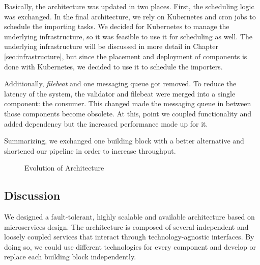 Basically, the architecture was updated in two places. First, the scheduling
logic was exchanged. In the final architecture, we rely on Kubernetes and
cron jobs to schedule the importing tasks. We decided for Kubernetes to
manage the underlying infrastructure, so it was feasible to use it for scheduling
as well. The underlying infrastructure will be discussed in more detail
in Chapter \ref{sec:infrastructure}, but since the placement and deployment
of components is done with Kubernetes, we decided to use it to schedule
the importers.

Additionally, \emph{filebeat} and one messaging queue got removed. To reduce
the latency of the system, the validator and filebeat were merged into a single
component: the consumer. This changed made the messaging queue in between
those components become obsolete. At this, point we coupled functionality
and added dependency but the increased performance made up for it.

Summarizing, we exchanged one building block with a better alternative
and shortened our pipeline in order to increase throughput.

\begin{figure}
	\caption{Evolution of Architecture}
	\label{fig:evol_architecture}
\end{figure}

\subsection{Discussion}\label{discussion}

We designed a fault-tolerant, highly scalable and available
architecture based on microservices design. The architecture is
composed of several independent and loosely coupled services that interact
through technology-agnostic interfaces. By doing so, we could use
different technologies for every component and develop or replace each building
block independently.


